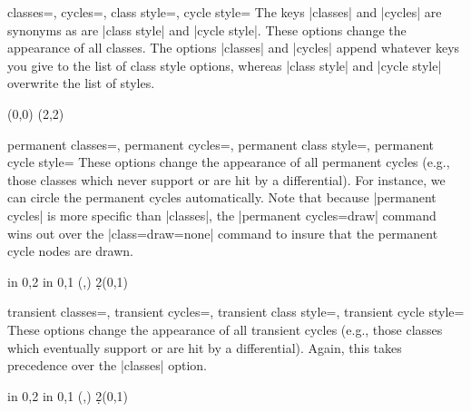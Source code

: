 \documentclass{ltxdoc}
\begin{document}
\begin{sseqdata}[name=ex1,degree={#1}{1-#1}]
\begin{keylist}{classes=, cycles=, class style=, cycle style=}
The keys |classes| and |cycles| are synonyms as are |class style| and |cycle style|. These options change the appearance of all classes. The options |classes| and |cycles| append whatever keys you give to the list of class style options, whereas |class style| and |cycle style| overwrite the list of styles.
\begin{codeexample}[]
\begin{sseqpage}[classes={blue,fill,minimum width=0.5em}]
\class(0,0)
\class(2,2)
\end{sseqpage}
\end{codeexample}
\end{keylist}


\begin{keylist}{permanent classes=, permanent cycles=, permanent class style=, permanent cycle style=}
These options change the appearance of all permanent cycles (e.g., those classes which never support or are hit by a differential). For instance, we can circle the permanent cycles automatically. Note that because |permanent cycles| is more specific than |classes|, the |permanent cycles={draw}| command wins out over the |class={draw=none}| command to insure that the permanent cycle nodes are drawn.
\begin{codeexample}[]
\begin{sseqpage}[cohomological Serre grading,
                 classes={draw=none},permanent cycles={draw}]
\foreach \x in {0,2} \foreach \y in {0,1}{
    \class["\mathbb{Z}"](\x,\y)
}
\d2(0,1)
\end{sseqpage}
\end{codeexample}
\end{keylist}

\begin{keylist}{transient classes=, transient cycles=, transient class style=, transient cycle style=}
These options change the appearance of all transient cycles (e.g., those classes which eventually support or are hit by a differential). Again, this takes precedence over the |classes| option.
\begin{codeexample}[]
\begin{sseqpage}[cohomological Serre grading,
                 classes={draw=none}, transient cycles=red]
\foreach \x in {0,2} \foreach \y in {0,1}{
    \class["\mathbb{Z}"](\x,\y)
}
\d2(0,1)
\end{sseqpage}
\end{codeexample}
\end{keylist}


\end{sseqdata}
\end{document}
